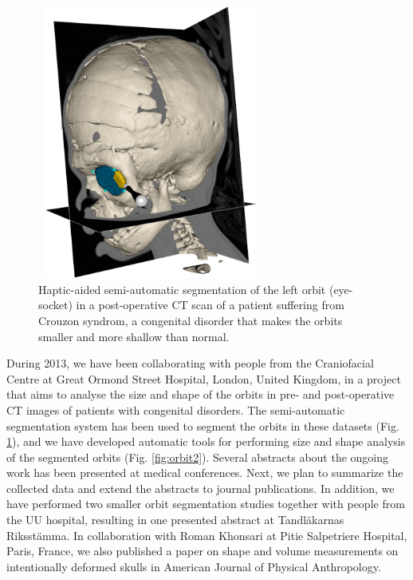 \documentclass[10pt, a4paper]{article}
\begin{document}
\begin{enumerate}
{\begin{figure}[!htbp]
\centering
\includegraphics[width=75mm,height=90mm]{figures/research/orbit_project_figure1.png}
\caption{Haptic-aided semi-automatic segmentation of the left orbit (eye-socket) in a post-operative CT scan of a patient suffering from Crouzon syndrom, a congenital disorder that makes the orbits smaller and more shallow than normal.}
\label{fig:orbit1}
\end{figure}

During 2013, we have been collaborating with people from the Craniofacial Centre at Great Ormond Street Hospital, London, United Kingdom, in a project that aims to analyse the size and shape of the orbits in pre- and post-operative CT images of patients with congenital disorders. The semi-automatic segmentation system has been used to segment the orbits in these datasets (Fig. \ref{fig:orbit1}), and we have developed automatic tools for performing size and shape analysis of the segmented orbits (Fig. \ref{fig:orbit2}). Several abstracts about the ongoing work has been presented at medical conferences. Next, we plan to summarize the collected data and extend the abstracts to journal publications. In addition, we have performed two smaller orbit segmentation studies together with people from the UU hospital, resulting in one presented abstract at Tandl\"{a}karnas Riksst\"{a}mma. In collaboration with Roman Khonsari at Pitie Salpetriere Hospital, Paris, France, we also published a paper on shape and volume measurements on intentionally deformed skulls in American Journal of Physical Anthropology.}


\end{enumerate}
\end{document}
